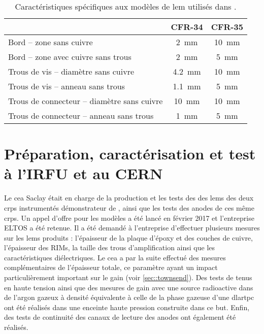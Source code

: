       \begin{table}
        \centering
        \begin{tabular}{|l|c|c|}
          \hline
           & CFR-34 & CFR-35\\
          \hline
          Bord -- zone sans cuivre & \SI{2}{\milli\meter} & \SI{10}{\milli\meter}\\
          Bord -- zone avec cuivre sans trous & \SI{2}{\milli\meter} & \SI{5}{\milli\meter}\\
          Trous de vis -- diamètre sans cuivre & \SI{4.2}{\milli\meter} & \SI{10}{\milli\meter} \\
          Trous de vis -- anneau sans trous &  \SI{1.1}{\milli\meter} & \SI{5}{\milli\meter} \\
          Trous de connecteur -- diamètre sans cuivre & \SI{10}{\milli\meter} & \SI{10}{\milli\meter} \\
          Trous de connecteur -- anneau sans trous & \SI{1}{\milli\meter} & \SI{5}{\milli\meter} \\
          \hline
        \end{tabular}
        \caption[Caractéristiques spécifiques aux modèles de LEM utilisés dans \protodp{}]{\label{tab::lem_diff}Caractéristiques spécifiques aux modèles de \gls{lem} utilisés dans \protodp{}.}
      \end{table}

  \section{Préparation, caractérisation et test à l'IRFU et au CERN}
    
    Le \gls{cea} Saclay était en charge de la production et les tests des des \glspl{lem} des deux \glspl{crp} instrumentés démonstrateur de \SSS{}, ainsi que les tests des anodes de ces même \glspl{crp}. Un appel d'offre pour les modèles a été lancé en février 2017 et l'entreprise ELTOS a été retenue. Il a été demandé à l'entreprise d'effectuer plusieurs mesures sur les \glspl{lem} produits : l'épaisseur de la plaque d'époxy et des couches de cuivre, l'épaisseur des RIMs, la taille des trous d'amplification ainsi que les caractéristiques diélectriques. Le \gls{cea} a par la suite effectué des mesures complémentaires de l'épaisseur totale, ce paramètre ayant un impact particulièrement important sur le gain (voir \autoref{sec::townsend}). Des tests de tenus en haute tension ainsi que des mesures de gain avec une source radioactive dans de l'argon gazeux à densité équivalente à celle de la phase gazeuse d'une \gls{dlartpc} ont été réalisés dans une enceinte haute pression construite dans ce but. Enfin, des tests de continuité des canaux de lecture des anodes ont également été réalisés.
        
